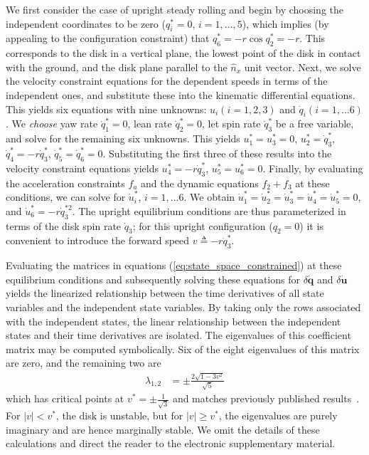\documentclass[smallcondensed,final]{svjour3}                     %
\begin{document}
We first consider the case of upright steady rolling and begin by choosing the
independent coordinates to be zero ($q_i^* = 0$, $i = 1,\dots,5$), which
implies (by appealing to the configuration constraint) that $q_6^* = -r
\cos{q_2^*} = -r$.  This corresponds to the disk in a vertical plane, the
lowest point of the disk in contact with the ground, and the disk plane
parallel to the $\hat{n}_x$ unit vector.  Next, we solve the velocity
constraint equations for the dependent speeds in terms of the independent ones,
and substitute these into the kinematic differential equations. This yields six
equations with nine unknowns: $u_i (i=1,2,3)$ and $\dot{q}_i (i=1,\dots6)$. We
\textit{choose} yaw rate $\dot{q}_1^* = 0$, lean rate $\dot{q}_2^* = 0$, let
spin rate $\dot{q}_3^*$ be a free variable, and solve for the remaining six
unknowns.  This yields $u_1^* = u_3^* = 0$, $u_2^* = \dot{q}_3^*$, $\dot{q}_4^*
= -r\dot{q}_3^*$, $\dot{q}_5^* = \dot{q}_6^* = 0$. Substituting the first three
of these results into the velocity constraint equations yields $u_4^* =
-r\dot{q}_3^*$, $u_5^* = u_6^* = 0$. Finally, by evaluating the acceleration
constraints $f_a$ and the dynamic equations $f_2 + f_3$ at these conditions, we
can solve for $\dot{u}_i^*$, $i = 1,\dots6$. We obtain $\dot{u}_1^* =
\dot{u}_2^* = \dot{u}_3^* = \dot{u}_4^* = \dot{u}_5^* = 0$, and $\dot{u}_6^* =
-r \dot{q}_3^{*2}$. The upright equilibrium conditions are thus parameterized
in terms of the disk spin rate $\dot{q}_3$; for this upright configuration
($q_2 = 0$) it is convenient to introduce the forward speed $v \triangleq
-r\dot{q}_3^*$.

Evaluating the matrices in equations (\ref{eq:state_space_constrained}) at
these equilibrium conditions and subsequently solving these equations for
$\delta\dot{\mathbf{q}}$ and $\delta\dot{\mathbf{u}}$ yields the linearized
relationship between the time derivatives of all state variables and the
independent state variables. By taking only the rows associated with the
independent states, the linear relationship between the independent states and
their time derivatives are isolated. The eigenvalues of this coefficient matrix
may be computed symbolically. Six of the eight eigenvalues of this matrix are
zero, and the remaining two are
\begin{align}
\label{eq:upright_evals}
  \lambda_{1,2} &= \pm \frac{2\sqrt{1 - 3v^2}}{\sqrt{5}}
\end{align}
which has critical points at $v^*=\pm\frac{1}{\sqrt{3}}$ and matches previously
published results~\cite{Schwab2003,Kane1985,Neimark1972}. For $|v| < v^*$,
the disk is unstable, but for $|v| \geq v^*$, the eigenvalues are purely
imaginary and are hence marginally stable. We omit the details of these
calculations and direct the reader to the electronic supplementary material.
\end{document}
